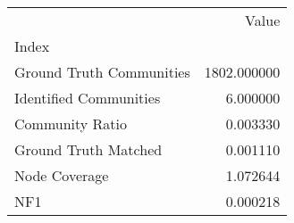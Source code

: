 \begin{tabular}{lr}
\toprule
{} &        Value \\
Index                    &              \\
\midrule
Ground Truth Communities &  1802.000000 \\
Identified Communities   &     6.000000 \\
Community Ratio          &     0.003330 \\
Ground Truth Matched     &     0.001110 \\
Node Coverage            &     1.072644 \\
NF1                      &     0.000218 \\
\bottomrule
\end{tabular}
